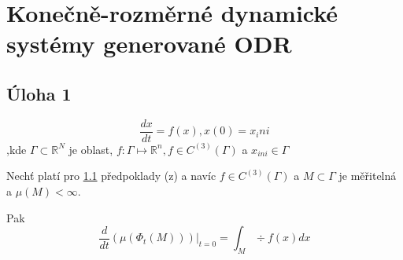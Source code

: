 \documentclass[../main.tex]{subfiles}
\begin{document}
\section{Konečně-rozměrné dynamické systémy generované ODR}


\subsection{Úloha 1}\label{sec:uloha1}

\begin{equation}
    \frac{d x}{d t} = f(x) , x(0) = x_ini 
\end{equation}
,kde 
$\Gamma \subset \mathbb{R}^N$ je oblast, $f: \Gamma \mapsto \mathbb{R}^n, f\in C^{(3)}(\Gamma)$ a $x_{ini} \in \Gamma$





\begin{theorem}[Liouville]
    Nechť platí pro \ref{sec:uloha1} předpoklady (z) a navíc 
    $f\in C^{(3)} (\Gamma)$ a $M\subset\Gamma$ je měřitelná a $\mu(M) < \infty$.

    Pak\begin{equation}
        \frac{d}{dt} \left(\mu (\Phi_t (M))\right)|_{t=0} = \int_M \div f(x) dx
    \end{equation}
\end{theorem}
\end{document}
